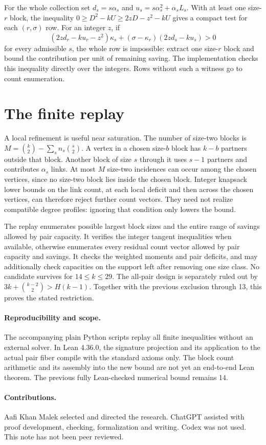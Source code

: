 \documentclass[11pt,letterpaper]{article}
\newcommand{\lastcase}{29}
\begin{document}
For the whole collection set $d_s=s\alpha_s$ and
$u_s=s\alpha_s^2+\alpha_s L_s$. With at least one size-$r$ block,
the inequality $0\ge D^2-kU\ge 2zD-z^2-kU$ gives a compact
test for each $(r,\sigma)$ row. For an integer $z$, if
\[
(2zd_r-ku_r-z^2)\kappa_s
  +(\sigma-\kappa_r)(2zd_s-ku_s)>0
\]
for every admissible $s$, the whole row is impossible: extract one
size-$r$ block and bound the contribution per unit of remaining
saving. The implementation checks this inequality directly over
the integers. Rows without such a witness go to count enumeration.

\newpage
\section{The finite replay}

A local refinement is useful near saturation. The number of size-two
blocks is $M=\binom{k}{2}-\sum_s n_s\binom{s}{2}$. A vertex in a
chosen size-$b$ block has $k-b$ partners outside that block. Another
block of size $s$ through it uses $s-1$ partners and contributes
$\alpha_s$ links. At most $M$ size-two incidences can occur among
the chosen vertices, since no size-two block lies inside the chosen
block. Integer knapsack lower bounds on the link count, at each
local deficit and then across the chosen vertices, can therefore
reject further count vectors. They need not realize compatible
degree profiles: ignoring that condition only lowers the bound.

The replay enumerates possible largest block sizes and the entire
range of savings allowed by pair capacity. It verifies the integer
tangent inequalities when available, otherwise enumerates every
residual count vector allowed by pair capacity and savings. It
checks the weighted moments and pair deficits, and may additionally
check capacities on the support left after removing one size class.
No candidate survives for $14\le k\le\lastcase$. The all-pair design
is separately ruled out by
$3k+\binom{k-2}{2}>H(k-1)$. Together with the previous exclusion
through 13, this proves the stated restriction.

\paragraph{Reproducibility and scope.}
The accompanying plain Python scripts replay all finite inequalities
without an external solver. In Lean 4.36.0, the signature projection
and its application to the actual pair fiber compile with the
standard axioms only. The block count arithmetic and its assembly
into the new bound are not yet an end-to-end Lean theorem. The
previous fully Lean-checked numerical bound remains 14.

\paragraph{Contributions.}
Aafi Khan Malek selected and directed the research. ChatGPT assisted
with proof development, checking, formalization and writing. Codex
was not used. This note has not been peer reviewed.
\end{document}

